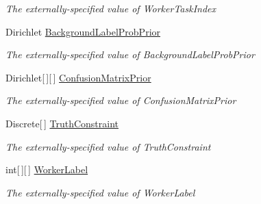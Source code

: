 \begin{DoxyCompactItemize}
\begin{DoxyCompactList}\small\item\em The externally-\/specified value of \textquotesingle{}Worker\+Task\+Index\textquotesingle{}\end{DoxyCompactList}\item 
Dirichlet \hyperlink{class_microsoft_research_1_1_infer_1_1_models_1_1_user_1_1_model___e_p_a5e94a159f468e8d365321779a4ac8ea1}{Background\+Label\+Prob\+Prior}
\begin{DoxyCompactList}\small\item\em The externally-\/specified value of \textquotesingle{}Background\+Label\+Prob\+Prior\textquotesingle{}\end{DoxyCompactList}\item 
Dirichlet\mbox{[}$\,$\mbox{]}\mbox{[}$\,$\mbox{]} \hyperlink{class_microsoft_research_1_1_infer_1_1_models_1_1_user_1_1_model___e_p_a5d2f1483d0debe876c9c9504738761e7}{Confusion\+Matrix\+Prior}
\begin{DoxyCompactList}\small\item\em The externally-\/specified value of \textquotesingle{}Confusion\+Matrix\+Prior\textquotesingle{}\end{DoxyCompactList}\item 
Discrete\mbox{[}$\,$\mbox{]} \hyperlink{class_microsoft_research_1_1_infer_1_1_models_1_1_user_1_1_model___e_p_acffd4167727f940a144a3efadfc2d805}{Truth\+Constraint}
\begin{DoxyCompactList}\small\item\em The externally-\/specified value of \textquotesingle{}Truth\+Constraint\textquotesingle{}\end{DoxyCompactList}\item 
int\mbox{[}$\,$\mbox{]}\mbox{[}$\,$\mbox{]} \hyperlink{class_microsoft_research_1_1_infer_1_1_models_1_1_user_1_1_model___e_p_a719f0824f1c1f497c4c4e29e61125b67}{Worker\+Label}
\begin{DoxyCompactList}\small\item\em The externally-\/specified value of \textquotesingle{}Worker\+Label\textquotesingle{}\end{DoxyCompactList}\end{DoxyCompactItemize}
